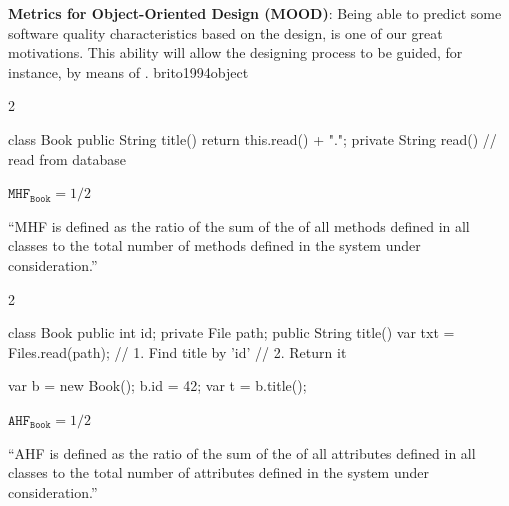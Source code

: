 \documentclass{article}
\begin{document}


  {\textbf{Metrics for Object-Oriented Design (MOOD)}: Being able to predict some software quality characteristics based on the design, is one of our great motivations. This ability will allow the designing process to be guided, for instance, by means of .}
  {brito1994object}

\begin{multicols}{2}
{\small\begin{ffcode}
class Book {
  public String title() {
    return this.read() + ".";
  }
  private String read() {
    // read from database
  }
}
\end{ffcode}
}
\par\columnbreak\par
\(\texttt{MHF}_\texttt{Book} = 1/2\)\par
``MHF is defined as the ratio of the sum of the  of all methods
defined in all classes to the total number of methods defined in the system
under consideration.''
\end{multicols}
\plush{}

\begin{multicols}{2}
{\small\begin{ffcode}
class Book {
  public int id;
  private File path;
  public String title() {
    var txt = Files.read(path);
    // 1. Find title by 'id'
    // 2. Return it
  }
}

var b = new Book();
b.id = 42;
var t = b.title();
\end{ffcode}
}
\par\columnbreak\par
\(\texttt{AHF}_\texttt{Book} = 1/2\)\par
``AHF is defined as the ratio of the sum of the  of all attributes
defined in all classes to the total number of attributes defined in the system
under consideration.''
\end{multicols}
\plush{}
\end{document}
